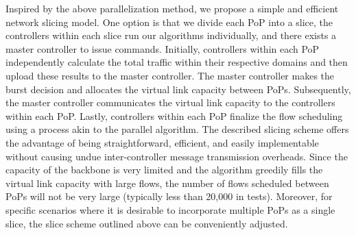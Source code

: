 Inspired by the above parallelization method, we propose a simple and efficient network slicing model. One option is that we divide each PoP into a slice, the controllers within each slice run our algorithms individually, and there exists a master controller to issue commands. Initially, controllers within each PoP independently calculate the total traffic within their respective domains and then upload these results to the master controller. The master controller makes the {\egress} burst decision and allocates the virtual link capacity between PoPs. Subsequently, the master controller communicates the virtual link capacity to the controllers within each PoP. Lastly, controllers within each PoP finalize the flow scheduling using a process akin to the parallel algorithm. The described slicing scheme offers the advantage of being straightforward, efficient, and easily implementable without causing undue inter-controller message transmission overheads. Since the capacity of the backbone is very limited and the algorithm greedily fills the virtual link capacity with large flows, the number of flows scheduled between PoPs will not be very large (typically less than 20,000 in tests). Moreover, for specific scenarios where it is desirable to incorporate multiple PoPs as a single slice, the slice scheme outlined above can be conveniently adjusted.

